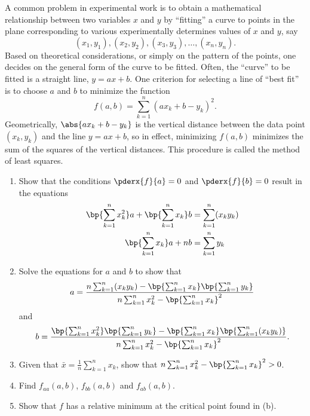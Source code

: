 \begin{problem}
    A common problem in experimental work is to obtain a mathematical relationship between two variables $x$ and $y$ by ``fitting'' a curve to points in the plane corresponding to various experimentally determines values of $x$ and $y$, say \[(x_1, y_1), (x_2, y_2), (x_3, y_3), \ldots, (x_n, y_n).\] Based on theoretical considerations, or simply on the pattern of the points, one decides on the general form of the curve to be fitted. Often, the ``curve'' to be fitted is a straight line, $y = ax + b$. One criterion for selecting a line of ``best fit'' is to choose $a$ and $b$ to minimize the function \[f(a, b) = \sum_{k = 1}^n (ax_k + b - y_k)^2.\] Geometrically, $\abs{ax_k + b - y_k}$ is the vertical distance between the data point $(x_k, y_k)$ and the line $y = ax + b$, so in effect, minimizing $f(a, b)$ minimizes the sum of the squares of the vertical distances. This procedure is called the method of least squares.

    \begin{enumerate}
        \item Show that the conditions $\pderx{f}{a} = 0$ and $\pderx{f}{b} = 0$ result in the equations
        \begin{align*}
            \bp{\sum_{k = 1}^n x_k^2} a + \bp{\sum_{k = 1}^n x_k} b &= \sum_{k = 1}^n (x_k y_k)\\
            \bp{\sum_{k = 1}^n x_k} a + nb &= \sum_{k = 1}^n y_k
        \end{align*}
        \item Solve the equations for $a$ and $b$ to show that \[a = \frac{n\sum_{k = 1}^n (x_k y_k) - \bp{\sum_{k = 1}^n x_k}\bp{\sum_{k = 1}^n y_k}}{n\sum_{k = 1}^n x_k^2 - \bp{\sum_{k = 1}^n x_k}^2}\] and \[b = \frac{\bp{\sum_{k = 1}^n x_k^2}\bp{\sum_{k = 1}^n y_k} - \bp{\sum_{k = 1}^n x_k}\bp{\sum_{k = 1}^n (x_k y_k)}}{n\sum_{k = 1}^n x_k^2 - \bp{\sum_{k = 1}^n x_k}^2}.\]
        \item Given that $\bar{x} =  \frac1n \sum_{k = 1}^n x_k$, show that $ n \sum_{k = 1}^n x_k^2 - \bp{\sum_{k = 1}^n x_k}^2 > 0$.
        \item Find $f_{aa}(a, b)$, $f_{bb}(a, b)$ and $f_{ab}(a, b)$.
        \item Show that $f$ has a relative minimum at the critical point found in (b).
    \end{enumerate}
\end{problem}
